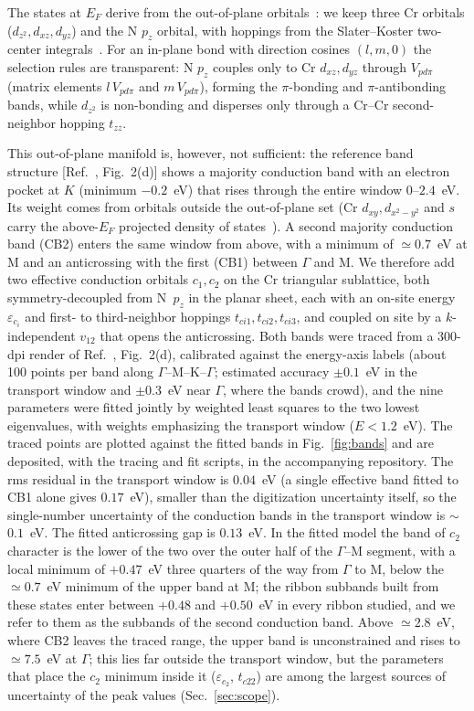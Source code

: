\documentclass[preprint,12pt]{elsarticle}
\begin{document}
The states at $E_F$ derive from the out-of-plane orbitals~\cite{Kuklin2017}: we keep three Cr
orbitals ($d_{z^2},d_{xz},d_{yz}$) and the N $p_z$ orbital, with hoppings from the Slater--Koster
two-center integrals~\cite{SlaterKoster1954}. For an in-plane bond with direction cosines
$(l,m,0)$ the selection rules are transparent: N $p_z$ couples only to Cr $d_{xz},d_{yz}$
through $V_{pd\pi}$ (matrix elements $l\,V_{pd\pi}$ and $m\,V_{pd\pi}$), forming the
$\pi$-bonding and $\pi$-antibonding bands, while $d_{z^2}$ is non-bonding and disperses only
through a Cr--Cr second-neighbor hopping $t_{zz}$.

This out-of-plane manifold is, however, not sufficient: the reference band structure
[Ref.~\cite{Kuklin2017}, Fig.~2(d)] shows a majority conduction band with an electron pocket at
$K$ (minimum $-0.2$~eV) that rises through the entire window $0$--$2.4$~eV. Its weight comes
from orbitals outside the out-of-plane set (Cr $d_{xy},d_{x^2-y^2}$ and $s$ carry the
above-$E_F$ projected density of states~\cite{Kuklin2017}). A second majority conduction band
(CB2) enters the same window from above, with a minimum of $\simeq0.7$~eV at M and an
anticrossing with the first (CB1) between $\Gamma$ and M. We therefore add two effective
conduction orbitals $c_1,c_2$ on the Cr triangular sublattice, both symmetry-decoupled from
N~$p_z$ in the planar sheet, each with an on-site energy $\varepsilon_{c_i}$ and first- to
third-neighbor hoppings $t_{ci1},t_{ci2},t_{ci3}$, and coupled on site by a $k$-independent
$v_{12}$ that opens the anticrossing. Both bands were traced from a 300-dpi render of
Ref.~\cite{Kuklin2017}, Fig.~2(d), calibrated against the energy-axis labels (about 100 points
per band along $\Gamma$--M--K--$\Gamma$; estimated accuracy $\pm0.1$~eV in the transport window
and $\pm0.3$~eV near $\Gamma$, where the bands crowd), and the nine parameters were fitted
jointly by weighted least squares to the two lowest eigenvalues, with weights emphasizing the
transport window ($E<1.2$~eV). The traced points are plotted against the fitted bands in
Fig.~\ref{fig:bands} and are deposited, with the tracing and fit scripts, in the accompanying
repository. The rms residual in the transport window is $0.04$~eV (a single effective band
fitted to CB1 alone gives $0.17$~eV), smaller than the digitization uncertainty itself, so the
single-number uncertainty of the conduction bands in the transport window is $\sim$$0.1$~eV.
The fitted anticrossing gap is $0.13$~eV. In the fitted model the band of $c_2$ character is
the lower of the two over the outer half of the $\Gamma$--M segment, with a local minimum of
$+0.47$~eV three quarters of the way from $\Gamma$ to M, below the $\simeq0.7$~eV minimum of
the upper band at M; the ribbon subbands built from these states enter between $+0.48$ and
$+0.50$~eV in every ribbon studied, and we refer to them as the subbands of the second
conduction band. Above $\simeq2.8$~eV, where CB2 leaves the traced range, the upper band is
unconstrained and rises to $\simeq7.5$~eV at $\Gamma$; this lies far outside the transport
window, but the parameters that place the $c_2$ minimum inside it ($\varepsilon_{c_2}$,
$t_{c22}$) are among the largest sources of uncertainty of the peak values
(Sec.~\ref{sec:scope}).
\end{document}
